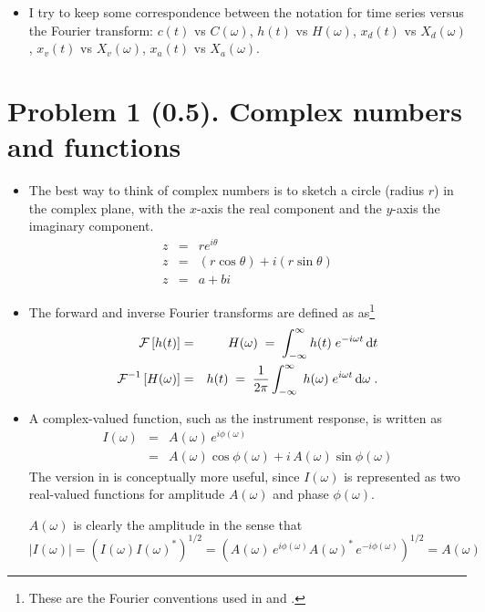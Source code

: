 \documentclass[11pt,titlepage,fleqn]{article}
\newcommand{\fft}{h}
\newcommand{\ffw}{H}
\begin{document}
\begin{itemize}
\item I try to keep some correspondence between the notation for time series versus the Fourier transform: $c(t)$ vs $C(\omega)$, $\fft(t)$ vs $\ffw(\omega)$, $x_d(t)$ vs $X_d(\omega)$, $x_v(t)$ vs $X_v(\omega)$, $x_a(t)$ vs $X_a(\omega)$.

\end{itemize}


\section*{Problem 1 (0.5). Complex numbers and functions}

\begin{itemize}
\item The best way to think of complex numbers is to sketch a circle (radius $r$) in the complex plane, with the $x$-axis the real component and the $y$-axis the imaginary component.
%
\begin{eqnarray*}
z &=& r e^{i\theta}
\\
z &=& (r\cos\theta) + i(r\sin\theta)
\\
z &=& a + bi
\end{eqnarray*}



\item The forward and inverse Fourier transforms are defined as as\footnote{These are the Fourier conventions used in \citet[][p.~109]{DT} and \citet[][Section 6.4.2]{SteinWysession}.}
%
\begin{eqnarray}
\cF \left[ \fft(t) \right] &=& \ffw(\omega)
\;=\; \int_{-\infty}^{\infty} \fft(t) \; e^{-i\omega t} \,\rmd t
\label{fft}
\\
\cF^{-1} \left[ \ffw(\omega) \right] &=& \fft(t) 
\;=\; \frac{1}{2\pi} \int_{-\infty}^{\infty} \; \fft(\omega) \; e^{i\omega t} \,\rmd\omega 
\label{ifft}
\;.
\end{eqnarray}


\item A complex-valued function, such as the instrument response, is written as
%
\begin{eqnarray}
I(\omega) &=& A(\omega)\,e^{i\phi(\omega)}
\label{Iw}
\\
&=& A(\omega)\cos\phi(\omega) + i\,A(\omega)\sin\phi(\omega)
\end{eqnarray}
%
The version in  is conceptually more useful, since $I(\omega)$ is represented as two real-valued functions for amplitude $A(\omega)$ and phase $\phi(\omega)$.

$A(\omega)$ is clearly the amplitude in the sense that
%
\begin{equation}
|I(\omega)| = \left( I(\omega) I(\omega)^* \right)^{1/2}
= \left( A(\omega)\,e^{i\phi(\omega)} A(\omega)^*\,e^{-i\phi(\omega)} \right)^{1/2}
= A(\omega)
\end{equation}

\end{itemize}
\end{document}
